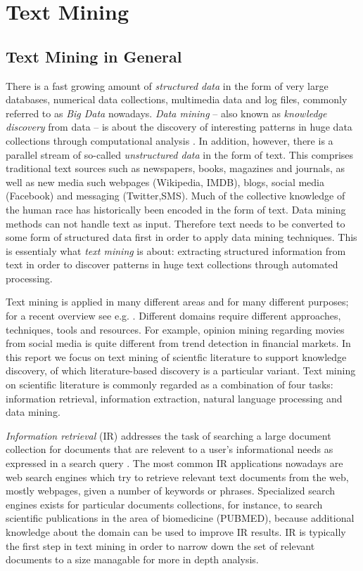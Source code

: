 
\chapter{Text Mining}

\section{Text Mining in General}

There is a fast growing amount of \emph{structured data} in the form of very large databases, numerical data collections, multimedia data and log files, commonly referred to as \emph{Big Data} nowadays.
\emph{Data mining} -- also known as \emph{knowledge discovery} from data -- is about the discovery of interesting patterns in huge data collections through computational analysis \citep{han2006data}.
In addition, however, there is a parallel stream of so-called \emph{unstructured data} in the form of text.
This comprises traditional text sources such as newspapers, books, magazines and journals, as well as new media such webpages (Wikipedia, IMDB), blogs, social media (Facebook) and messaging (Twitter,SMS).
Much of the collective knowledge of the human race has historically been encoded in the form of text. 
Data mining methods can not handle text as input.
Therefore text needs to be converted to some form of structured data first in order to apply data mining techniques.
This is essentialy what \emph{text mining} is about: extracting structured information from text in order to discover patterns in huge text collections through automated processing.

Text mining is applied in many different areas and for many different purposes; for a recent overview see e.g. \citep{Aggarwal2012Mining,Weiss2012Fundamentals}.
Different domains require different approaches, techniques, tools and resources.
For example, opinion mining regarding movies from social media is quite different from trend detection in financial markets. 
In this report we focus on text mining of scientfic literature to support knowledge discovery, of which literature-based discovery is a particular variant.
Text mining on scientific literature is commonly regarded as a combination of four tasks: information retrieval, information extraction, natural language processing and data mining.

\emph{Information retrieval} (IR) addresses the task of searching a large document collection for documents that are relevent to a user's informational needs as expressed in a search query \citep{ManningRaghavanSchutze:08}. 
The most common IR applications nowadays are web search engines which try to retrieve relevant text documents from the web, mostly webpages, given a number of keywords or phrases.
Specialized search engines exists for particular documents collections, for instance, to search scientific publications in the area of biomedicine (PUBMED), because additional knowledge about the domain can be used to improve IR results.
IR is typically the first step in text mining in order to narrow down the set of relevant documents to a size managable for more in depth analysis.


